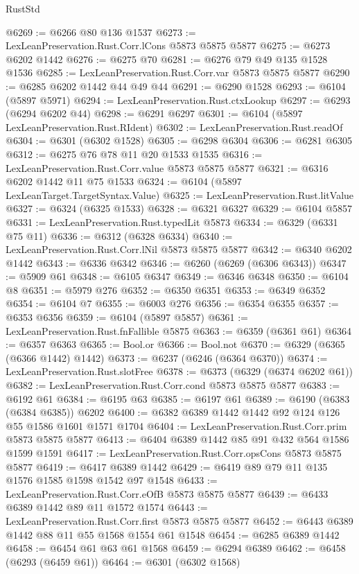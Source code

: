 \begin{lexlean}{RustStd}
\begin{coremodule}
{\begin{coremodule}
{{{{{{{{{{{{{{{{{{{{{{{{{{{{{{{{{{{@6269 := @6266 @80 @136 @1537
@6273 := LexLeanPreservation.Rust.Corr.lCons @5873 @5875 @5877
@6275 := @6273 @6202 @1442
@6276 := @6275 @70
@6281 := @6276 @79 @49 @135 @1528 @1536
@6285 := LexLeanPreservation.Rust.Corr.var @5873 @5875 @5877
@6290 := @6285 @6202 @1442 @44 @49 @44
@6291 := @6290 @1528
@6293 := @6104 (@5897 @5971)
@6294 := LexLeanPreservation.Rust.ctxLookup
@6297 := @6293 (@6294 @6202 @44)
@6298 := @6291 @6297
@6301 := @6104 (@5897 LexLeanPreservation.Rust.RIdent)
@6302 := LexLeanPreservation.Rust.readOf
@6304 := @6301 (@6302 @1528)
@6305 := @6298 @6304
@6306 := @6281 @6305
@6312 := @6275 @76 @78 @11 @20 @1533 @1535
@6316 := LexLeanPreservation.Rust.Corr.value @5873 @5875 @5877
@6321 := @6316 @6202 @1442 @11 @75 @1533
@6324 := @6104 (@5897 LexLeanTarget.TargetSyntax.Value)
@6325 := LexLeanPreservation.Rust.litValue
@6327 := @6324 (@6325 @1533)
@6328 := @6321 @6327
@6329 := @6104 @5857
@6331 := LexLeanPreservation.Rust.typedLit @5873
@6334 := @6329 (@6331 @75 @11)
@6336 := @6312 (@6328 @6334)
@6340 := LexLeanPreservation.Rust.Corr.lNil @5873 @5875 @5877
@6342 := @6340 @6202 @1442
@6343 := @6336 @6342
@6346 := @6260 (@6269 (@6306 @6343))
@6347 := @5909 @61
@6348 := @6105 @6347
@6349 := @6346 @6348
@6350 := @6104 @8
@6351 := @5979 @276
@6352 := @6350 @6351
@6353 := @6349 @6352
@6354 := @6104 @7
@6355 := @6003 @276
@6356 := @6354 @6355
@6357 := @6353 @6356
@6359 := @6104 (@5897 @5857)
@6361 := LexLeanPreservation.Rust.fnFallible @5875
@6363 := @6359 (@6361 @61)
@6364 := @6357 @6363
@6365 := Bool.or
@6366 := Bool.not
@6370 := @6329 (@6365 (@6366 @1442) @1442)
@6373 := @6237 (@6246 (@6364 @6370))
@6374 := LexLeanPreservation.Rust.slotFree
@6378 := @6373 (@6329 (@6374 @6202 @61))
@6382 := LexLeanPreservation.Rust.Corr.cond @5873 @5875 @5877
@6383 := @6192 @61
@6384 := @6195 @63
@6385 := @6197 @61
@6389 := @6190 (@6383 (@6384 @6385)) @6202
@6400 := @6382 @6389 @1442 @1442 @92 @124 @126 @55 @1586 @1601 @1571 @1704
@6404 := LexLeanPreservation.Rust.Corr.prim @5873 @5875 @5877
@6413 := @6404 @6389 @1442 @85 @91 @432 @564 @1586 @1599 @1591
@6417 := LexLeanPreservation.Rust.Corr.opsCons @5873 @5875 @5877
@6419 := @6417 @6389 @1442
@6429 := @6419 @89 @79 @11 @135 @1576 @1585 @1598 @1542 @97 @1548
@6433 := LexLeanPreservation.Rust.Corr.eOfB @5873 @5875 @5877
@6439 := @6433 @6389 @1442 @89 @11 @1572 @1574
@6443 := LexLeanPreservation.Rust.Corr.first @5873 @5875 @5877
@6452 := @6443 @6389 @1442 @88 @11 @55 @1568 @1554 @61 @1548
@6454 := @6285 @6389 @1442
@6458 := @6454 @61 @63 @61 @1568
@6459 := @6294 @6389
@6462 := @6458 (@6293 (@6459 @61))
@6464 := @6301 (@6302 @1568)
}}}}}}}}}}}}}}}}}}}}}}}}}}}}}}}}}}}
\end{coremodule}}
\end{coremodule}
\end{lexlean}
